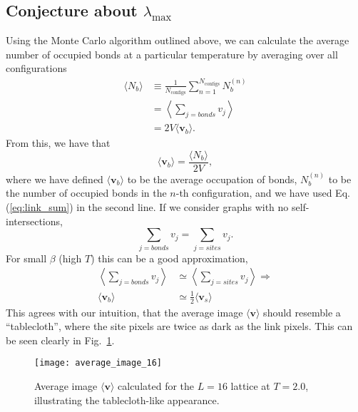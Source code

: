 \documentclass[../main.tex]{subfiles}
\begin{document}
\subsection{Conjecture about \texorpdfstring{$\lambda_{\max}$}{λmax}}%
\label{ssec:conjecture}
Using the Monte Carlo algorithm outlined above, we can calculate the average
number of occupied bonds at a particular temperature by averaging over all
configurations
%
\begin{align}
    \langle N_b\rangle
        &\equiv \frac{1}{N_{\mathrm{configs}}}\sum_{n=1}^{N_{\mathrm{\mathrm{configs}}}} N_b^{(n)}\\
        &= \left\langle \sum_{j=bonds} v_j \right\rangle \\
        &= 2V\langle \mathbf{v}_b\rangle.
    \label{eq:link_avg}
\end{align}
%
From this, we have that
%
\begin{equation}
    \langle \mathbf{v}_b\rangle = \frac{\langle N_b\rangle}{2V},
\end{equation}
%
where we have defined $\langle \mathbf{v}_b\rangle$ to be the average
occupation of bonds, $N_b^{(n)}$ to be the number of occupied bonds in the
$n$-th configuration, and we have used Eq. (\ref{eq:link_sum}) in the second
line.
%
If we consider graphs with no self-intersections,
%
\begin{equation}
    \sum_{j=bonds} v_j = \sum_{j=sites} v_j.
    \label{bonds_equal_sites}
\end{equation}
%
For small $\beta$ (high $T$) this can be a good approximation,
%
\begin{align}
    \left\langle \sum_{j=bonds} v_j \right\rangle &\simeq \left\langle
    \sum_{j=sites} v_j\right\rangle\Longrightarrow\\
    \langle\mathbf{v}_b\rangle &\simeq \frac{1}{2}\langle\mathbf{v}_s\rangle
    \label{avg_bonds_equal_sites}
\end{align}
%
This agrees with our intuition, that the average image $\langle
\mathbf{v}\rangle$ should resemble a ``tablecloth'', where the site pixels are
twice as dark as the link pixels.
%
This can be seen clearly in Fig.~\ref{fig:average_image}.
%
\begin{figure}[htpb]
    \centering
    \texttt{[image: average\_image\_16]}
    \caption{Average image $\langle \mathbf{v}\rangle$ calculated for the
        $L = 16$ lattice at $T = 2.0$, illustrating the
        tablecloth-like appearance.}%
\label{fig:average_image}
\end{figure}
\end{document}
